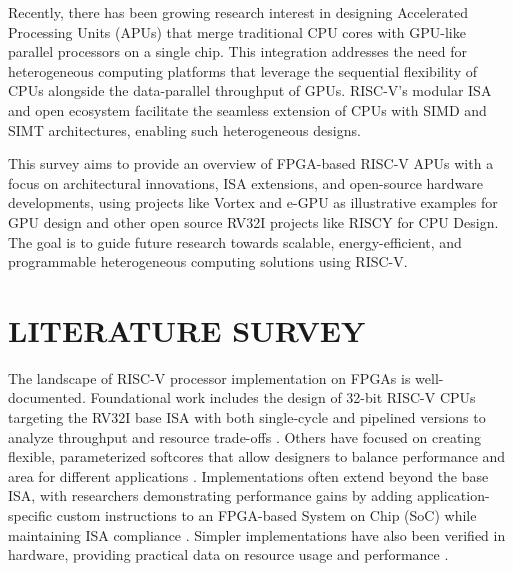 \documentclass[a4paper,twoside]{article}
\begin{document}
Recently, there has been growing research interest in designing Accelerated Processing Units (APUs) that merge traditional CPU cores with GPU-like parallel processors on a single chip. This integration addresses the need for heterogeneous computing platforms that leverage the sequential flexibility of CPUs alongside the data-parallel throughput of GPUs. RISC-V's modular ISA and open ecosystem facilitate the seamless extension of CPUs with SIMD and SIMT architectures, enabling such heterogeneous designs.

This survey aims to provide an overview of FPGA-based RISC-V APUs with a focus on architectural innovations, ISA extensions, and open-source hardware developments, using projects like Vortex and e-GPU as illustrative examples for GPU design and other open source RV32I projects like RISCY for CPU Design. The goal is to guide future research towards scalable, energy-efficient, and programmable heterogeneous computing solutions using RISC-V.

\section{\uppercase{Literature Survey}}
\label{sec:survey}

The landscape of RISC-V processor implementation on FPGAs is well-documented. Foundational work includes the design of 32-bit RISC-V CPUs targeting the RV32I base ISA with both single-cycle and pipelined versions to analyze throughput and resource trade-offs \cite{Rao2024}. Others have focused on creating flexible, parameterized softcores that allow designers to balance performance and area for different applications \cite{Rodrigues2019}. Implementations often extend beyond the base ISA, with researchers demonstrating performance gains by adding application-specific custom instructions to an FPGA-based System on Chip (SoC) while maintaining ISA compliance \cite{Li2019}. Simpler implementations have also been verified in hardware, providing practical data on resource usage and performance \cite{Begum2023}.
\end{document}
